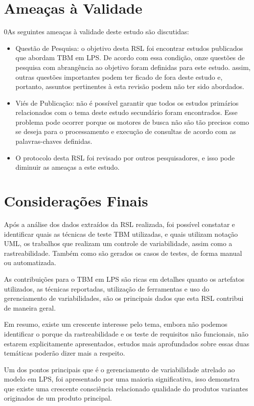 \section{Ameaças à Validade}
0As seguintes ameaças à validade deste estudo são discutidas:

\begin{itemize}
	\item Questão de Pesquisa: o objetivo desta RSL foi encontrar estudos publicados que abordam TBM em LPS. De acordo com essa condição, onze questões de pesquisa com abrangência ao objetivo foram definidas para este estudo. assim, outras questões importantes podem ter ficado de fora deste estudo e, portanto, assuntos pertinentes à esta revisão podem não ter sido abordados.
	\item Viés de Publicação: não é possível garantir que todos os estudos primários relacionados com o tema deste estudo secundário foram encontrados. Esse problema pode ocorrer porque os motores de busca não são tão precisos como se deseja para o processamento e execução de consultas de acordo com as palavras-chaves definidas.
	\item O protocolo desta RSL foi revisado por outros pesquisadores, e isso pode diminuir as ameaças a este estudo.	

	
\end{itemize}


\section{Considerações Finais}
Após a análise dos dados extraídos da RSL realizada, foi possível constatar e identificar quais as técnicas de teste TBM utilizadas, e quais utilizam notação UML, os trabalhos que realizam um controle de variabilidade, assim como a rastreabilidade. Também como são gerados os casos de testes, de forma manual ou automatizada.

As contribuições para o TBM em LPS são ricas em detalhes quanto os artefatos utilizados, as técnicas reportadas, utilização de ferramentas e uso do gerenciamento de variabilidades, são os principais dados que esta RSL contribui de maneira geral.

Em resumo, existe um crescente interesse pelo tema, embora não podemos identificar o porque da rastreabilidade e os teste de requisitos não funcionais, não estarem explicitamente apresentados, estudos mais aprofundados sobre essas duas temáticas poderão dizer mais a respeito.

Um dos pontos principais que é o gerenciamento de variabilidade atrelado ao modelo em LPS, foi apresentado por uma maioria significativa, isso demonstra que existe uma crescente consciência relacionado qualidade do produtos variantes originados de um produto principal.


